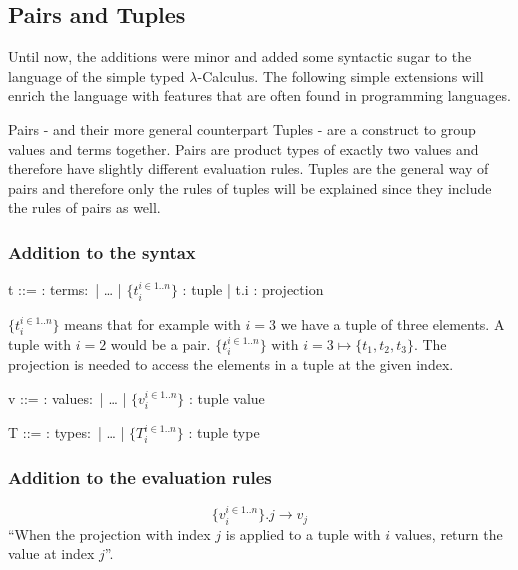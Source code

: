 \subsection{Pairs and Tuples}

Until now, the additions were minor and added some syntactic sugar to the language of
the simple typed $\lambda$-Calculus. The following simple extensions will enrich
the language with features that are often found in programming languages.

Pairs - and their more general counterpart Tuples - are a construct to group
values and terms together. Pairs are product types of exactly two values
and therefore have slightly different evaluation rules. Tuples are the general way
of pairs and therefore only the rules of tuples will be explained since they include
the rules of pairs as well.

\subsubsection{Addition to the syntax \cite{pierce2002ProgLang}}
\begin{bnfgrammar}
    t ::= : terms$\colon$
    | \dots
    | $\{t_i^{i \in 1..n}\}$ : tuple
    | t.i : projection
\end{bnfgrammar}\leavevmode\newline
$\{t_i^{i \in 1..n}\}$ means that for example with $i=3$ we have a tuple
of three elements. A tuple with $i=2$ would be a pair.
$\{t_i^{i \in 1..n}\} \text{ with } i=3 \mapsto \{t_1, t_2, t_3\}$.
The projection is needed to access the elements in a tuple at the given index.

\begin{bnfgrammar}
    v ::= : values$\colon$
    | \dots
    | $\{v_i^{i \in 1..n}\}$ : tuple value
\end{bnfgrammar}\leavevmode\newline

\begin{bnfgrammar}
    T ::= : types$\colon$
    | \dots
    | $\{T_i^{i \in 1..n}\}$ : tuple type
\end{bnfgrammar}\leavevmode\newline

\subsubsection{Addition to the evaluation rules \cite{pierce2002ProgLang}}
\begin{equation*}
    \tag{Tuple projection}
    \{v_i^{i \in 1..n}\} . j \rightarrow v_j
\end{equation*}
``When the projection with index $j$ is applied to a tuple with
$i$ values, return the value at index $j$''.

